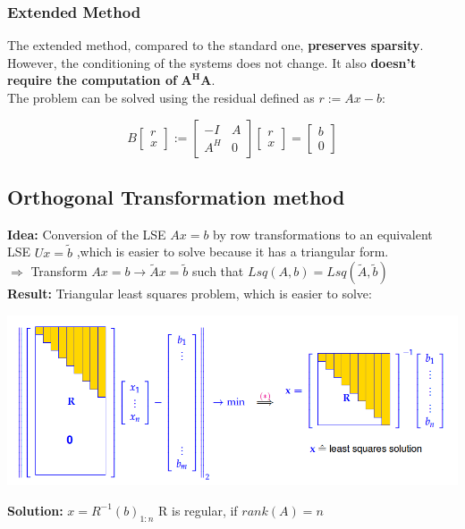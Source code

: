 \documentclass[12pt, a4paper]{article}
\begin{document}
\subsubsection{Extended Method}

The extended method, compared to the standard one, \textbf{preserves sparsity}. However, the conditioning of the systems does not change. It also \textbf{doesn't require the computation of} $\mathbf{A^HA}$. \\

The problem can be solved using the residual defined as $r := Ax - b$:

\begin{equation*}
	B\begin{bmatrix}r \\ x \end{bmatrix} := \begin{bmatrix}
		-I & A \\ A^H & 0
	\end{bmatrix} \begin{bmatrix}
		r \\ x
	\end{bmatrix} = \begin{bmatrix}
		b \\ 0
	\end{bmatrix}
\end{equation*}

\subsection{Orthogonal Transformation method}
\begin{tcolorbox}
	\textbf{Idea:} Conversion of the LSE $Ax=b$ by row transformations to an equivalent LSE $Ux=\tilde b$ ,which is easier to solve because it has a triangular form. \vspace{2mm}\\
$\Rightarrow$ Transform $Ax=b \longrightarrow \tilde Ax = \tilde b$ such that $Lsq(A,b) = Lsq(\tilde A, \tilde b)$ \\

\textbf{Result:} Triangular least squares problem, which is easier to solve:
\begin{center}
	\includegraphics[width=380pt]{orthogonalTransformation_1.png}
\end{center}

\textbf{Solution:} \quad $x=R^{-1}(b)_{1:n}$ \hspace{35mm} R is regular, if $rank(A)=n$
\end{tcolorbox}
\end{document}
